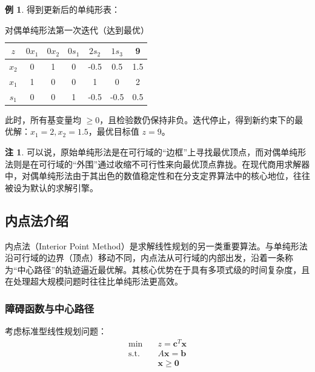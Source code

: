 \documentclass[12pt]{article}
\theoremstyle{plain}
\theoremstyle{definition}
\newtheorem{rmk}{注}[subsection]
\newtheorem{exm}{例}[subsection]
\newcommand{\st}{\mathrel{\text{s.t.}}}
\begin{document}
\begin{exm}
    得到更新后的单纯形表：
    \begin{table}[!htbp]
        \centering
        \caption{对偶单纯形法第一次迭代（达到最优）}
        \label{tab:dual_simplex_iteration1}
        \begin{tabular}{c|ccccc|c}
            \hline
            $z$ & $0x_1$ & $0x_2$ & $0s_1$ & $2s_2$ & $1s_3$ & 9 \\
            \hline
            $x_2$ & 0 & 1 & 0 & -0.5 & 0.5 & 1.5 \\
            $x_1$ & 1 & 0 & 0 & 1 & 0 & 2 \\
            $s_1$ & 0 & 0 & 1 & -0.5 & -0.5 & 0.5 \\
            \hline
        \end{tabular}
    \end{table}

    此时，所有基变量均 $\geq 0$，且检验数仍保持非负。迭代停止，得到新约束下的最优解：$x_1 = 2, x_2 = 1.5$，最优目标值 $z = 9$。
\end{exm}
\begin{rmk}
    可以说，原始单纯形法是在可行域的“边框”上寻找最优顶点，而对偶单纯形法则是在可行域的“外围”通过收缩不可行性来向最优顶点靠拢。在现代商用求解器中，对偶单纯形法由于其出色的数值稳定性和在分支定界算法中的核心地位，往往被设为默认的求解引擎。
\end{rmk}

\subsection{内点法介绍}\label{subsec:interior_point_method}

内点法（Interior Point Method）是求解线性规划的另一类重要算法。与单纯形法沿可行域的边界（顶点）移动不同，内点法从可行域的内部出发，沿着一条称为“中心路径”的轨迹逼近最优解。其核心优势在于具有多项式级的时间复杂度，且在处理超大规模问题时往往比单纯形法更高效。

\subsubsection{障碍函数与中心路径}\label{subsubsec:barrier_function}

考虑标准型线性规划问题：
\begin{align*}
    \min \quad & z = \bm{c}^T \bm{x} \\
    \st \quad & A\bm{x} = \bm{b} \\
    & \bm{x} \geq \bm{0}
\end{align*}
\end{document}
